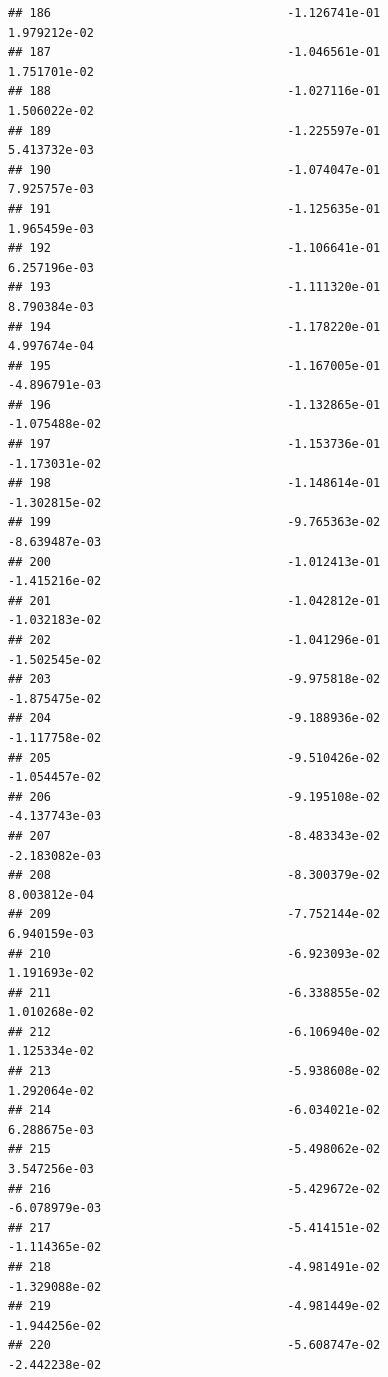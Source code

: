 \documentclass[
]{article}
\begin{document}
\begin{verbatim}
## 186                                 -1.126741e-01           1.979212e-02
## 187                                 -1.046561e-01           1.751701e-02
## 188                                 -1.027116e-01           1.506022e-02
## 189                                 -1.225597e-01           5.413732e-03
## 190                                 -1.074047e-01           7.925757e-03
## 191                                 -1.125635e-01           1.965459e-03
## 192                                 -1.106641e-01           6.257196e-03
## 193                                 -1.111320e-01           8.790384e-03
## 194                                 -1.178220e-01           4.997674e-04
## 195                                 -1.167005e-01          -4.896791e-03
## 196                                 -1.132865e-01          -1.075488e-02
## 197                                 -1.153736e-01          -1.173031e-02
## 198                                 -1.148614e-01          -1.302815e-02
## 199                                 -9.765363e-02          -8.639487e-03
## 200                                 -1.012413e-01          -1.415216e-02
## 201                                 -1.042812e-01          -1.032183e-02
## 202                                 -1.041296e-01          -1.502545e-02
## 203                                 -9.975818e-02          -1.875475e-02
## 204                                 -9.188936e-02          -1.117758e-02
## 205                                 -9.510426e-02          -1.054457e-02
## 206                                 -9.195108e-02          -4.137743e-03
## 207                                 -8.483343e-02          -2.183082e-03
## 208                                 -8.300379e-02           8.003812e-04
## 209                                 -7.752144e-02           6.940159e-03
## 210                                 -6.923093e-02           1.191693e-02
## 211                                 -6.338855e-02           1.010268e-02
## 212                                 -6.106940e-02           1.125334e-02
## 213                                 -5.938608e-02           1.292064e-02
## 214                                 -6.034021e-02           6.288675e-03
## 215                                 -5.498062e-02           3.547256e-03
## 216                                 -5.429672e-02          -6.078979e-03
## 217                                 -5.414151e-02          -1.114365e-02
## 218                                 -4.981491e-02          -1.329088e-02
## 219                                 -4.981449e-02          -1.944256e-02
## 220                                 -5.608747e-02          -2.442238e-02

\end{verbatim}
\end{document}
